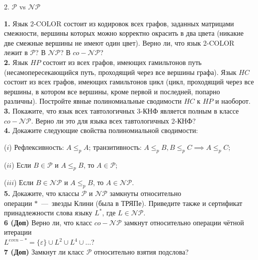 \documentclass[11pt,a5paper,fleqn]{article}
\begin{document}
\begin{center}
{ \Large 2. $\mathcal{P}$ vs $\mathcal{NP}$}

\end{center}
{\bf 1.} Язык 2-COLOR состоит из кодировок всех графов, заданных матрицами смежности, вершины которых можно корректно окрасить в два цвета (никакие две смежные вершины не имеют один цвет). Верно ли, что язык 2-COLOR лежит в $\mathcal{P}$? В $\mathcal{NP}$? В $co-\mathcal{NP}$?\\
\smallskip
{\bf 2.}  Язык $HP$ состоит из всех графов, имеющих гамильтонов путь (несамопересекающийся путь, проходящий через все вершины графа). Язык $HC$ состоит из всех графов, имеющих гамильтонов цикл (цикл, проходящий через все вершины, в котором все вершины, кроме первой и последней, попарно различны).
Постройте явные полиномиальные сводимости $HC$ к $HP$ и наоборот.\\
\smallskip
{\bf 3.}  Покажите, что язык всех тавтологичных 3-КНФ является полным в классе $co-\mathcal{NP}$. Верно ли это для языка всех тавтологичных 2-КНФ? \\
\smallskip
{\bf 4.}  Докажите следующие свойства полиномиальной сводимости:

($i$) Рефлексивность: $A\leq_p A$; транзитивность: $A\leq_p B, B\leq_p C \implies A\leq_p C$;

($ii$) Если $B\in\mathcal{P}$ и $A\leq_p B$, то $A\in\mathcal{P}$;

($iii$) Если $B\in\mathcal{NP}$ и $A\leq_p B$, то $A\in\mathcal{NP}$.\\
\smallskip
{\bf 5.}  Докажите, что классы $\mathcal{P}$ и $\mathcal{NP}$ замкнуты относительно \\
операции $*$~---~звезды Клини (была в ТРЯПе). Приведите также и сертификат принадлежности слова языку $L^*$, где $L\in\mathcal{NP}$. \\
\smallskip
{\bf 6 (Доп)}  Верно ли, что класс $co-\mathcal{NP}$ замкнут относительно операции чётной итерации \\
$L^{even-*} = \{\varepsilon\} \cup L^2 \cup L^4 \cup\dotsc$? \\
\smallskip
{\bf 7 (Доп)} Замкнут ли класс $\mathcal{P}$ относительно взятия подслова? \\
\end{document}

